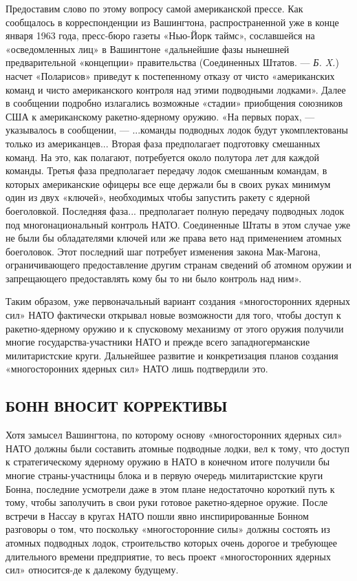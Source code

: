 \documentclass[12pt, a4paper, openany]{book}
\begin{document}
Предоставим слово по этому вопросу самой американской прессе. Как сообщалось в корреспонденции из Вашингтона, распространенной уже в конце января 1963 года, пресс-бюро газеты «Нью-Йорк таймс», сославшейся на «осведомленных лиц» в Вашингтоне «дальнейшие фазы нынешней предварительной «концепции» правительства (Соединенных Штатов. — \textit{Б. X.}) насчет «Поларисов» приведут к постепенному отказу от чисто «американских команд и чисто американского контроля над этими подводными лодками». Далее в сообщении подробно излагались возможные «стадии» приобщения союзников США к американскому ракетно-ядерному оружию. «На первых порах, — указывалось в сообщении, — ...команды подводных лодок будут укомплектованы только из американцев... Вторая фаза предполагает подготовку смешанных команд. На это, как полагают, потребуется около полутора лет для каждой команды. Третья фаза предполагает передачу лодок смешанным командам, в которых американские офицеры все еще держали бы в своих руках минимум один из двух «ключей», необходимых чтобы запустить ракету с ядерной боеголовкой. Последняя фаза... предполагает полную передачу подводных лодок под многонациональный контроль НАТО. Соединенные Штаты в этом случае уже не были бы обладателями ключей или же права вето над применением атомных боеголовок. Этот последний шаг потребует изменения закона Мак-Магона, ограничивающего предоставление другим странам сведений об атомном оружии и запрещающего предоставлять кому бы то ни было контроль над ним».

Таким образом, уже первоначальный вариант создания «многосторонних ядерных сил» НАТО фактически открывал новые возможности для того, чтобы доступ к ракетно-ядерному оружию и к спусковому механизму от этого оружия получили многие государства-участники НАТО и прежде всего западногерманские милитаристские круги. Дальнейшее развитие и конкретизация планов создания «многосторонних ядерных сил» НАТО лишь подтвердили это.

	\subsection[Бонн вносит коррективы]{\center БОНН ВНОСИТ КОРРЕКТИВЫ}


Хотя замысел Вашингтона, по которому основу «многосторонних ядерных сил» НАТО должны были составить атомные подводные лодки, вел к тому, что доступ к стратегическому ядерному оружию в НАТО в конечном итоге получили бы многие страны-участницы блока и в первую очередь милитаристские круги Бонна, последние усмотрели даже в этом плане недостаточно короткий путь к тому, чтобы заполучить в свои руки готовое ракетно-ядерное оружие. После встречи в Нассау в кругах НАТО пошли явно инспирированные Бонном разговоры о том, что поскольку «многосторонние силы» должны состоять из атомных подводных лодок, строительство которых очень дорогое и требующее длительного времени предприятие, то весь проект «многосторонних ядерных сил» относится-де к далекому будущему.
\end{document}
